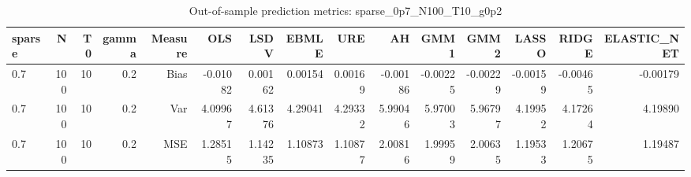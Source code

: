 \begin{table}[!htbp]\centering
\caption{Out-of-sample prediction metrics: sparse_0p7_N100_T10_g0p2}
\label{tab:table3_sparse_0p7_N100_T10_g0p2}
\begin{tabular}{lrrrrrrrrrrrrrr}
\hline
sparse & N & T0 & gamma & Measure & OLS & LSDV & EBMLE & URE & AH & GMM1 & GMM2 & LASSO & RIDGE & ELASTIC_NET \\
\hline
0.7 & 100 & 10 & 0.2 & Bias & -0.01082 & 0.00162 & 0.00154 & 0.00169 & -0.00186 & -0.00225 & -0.00229 & -0.00159 & -0.00465 & -0.00179 \\
0.7 & 100 & 10 & 0.2 & Var & 4.09967 & 4.61376 & 4.29041 & 4.29332 & 5.99046 & 5.97003 & 5.96797 & 4.19952 & 4.17264 & 4.19890 \\
0.7 & 100 & 10 & 0.2 & MSE & 1.28515 & 1.14235 & 1.10873 & 1.10877 & 2.00816 & 1.99959 & 2.00635 & 1.19533 & 1.20675 & 1.19487 \\
\hline
\end{tabular}
\end{table}

